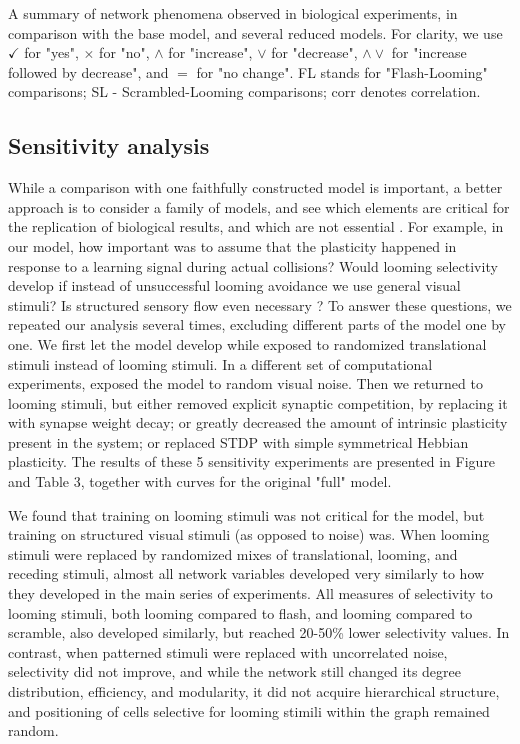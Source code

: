 \documentclass{article}
\begin{document}
\begin{table}
    
    \caption{A summary of network phenomena observed in biological experiments, in comparison with the base model, and several reduced models. For clarity, we use $\checkmark$ for "yes", $\times$ for "no", $\land$ for "increase", $\lor$ for "decrease", $\land \lor$ for "increase followed by decrease", and $=$ for "no change". FL stands for "Flash-Looming" comparisons; SL - Scrambled-Looming comparisons; corr denotes correlation.}
\end{table}
\restoregeometry

\subsection*{Sensitivity analysis}

While a comparison with one faithfully constructed model is important, a better approach is to consider a family of models, and see which elements are critical for the replication of biological results, and which are not essential \citep{linderman2017constrain,pauli2018repro}. For example, in our model, how important was to assume that the plasticity happened in response to a learning signal during actual collisions? Would  looming selectivity develop if instead of unsuccessful looming avoidance we use general visual stimuli? Is structured sensory flow even necessary \citep{triplett2018emergence}? To answer these questions, we repeated our analysis several times, excluding different parts of the model one by one. We first let the model develop while exposed to randomized translational stimuli instead of looming stimuli. In a different set of computational experiments, exposed the model to random visual noise. Then we returned to looming stimuli, but either removed explicit synaptic competition, by replacing it with synapse weight decay; or greatly decreased the amount of intrinsic plasticity present in the system; or replaced STDP with simple symmetrical Hebbian plasticity. The results of these 5 sensitivity experiments are presented in Figure and Table 3, together with curves for the original "full" model.

We found that training on looming stimuli was not critical for the model, but training on structured visual stimuli (as opposed to noise) was. When looming stimuli were replaced by randomized mixes of translational, looming, and receding stimuli, almost all network variables developed very similarly to how they developed in the main series of experiments. All measures of selectivity to looming stimuli, both looming compared to flash, and looming compared to scramble, also developed similarly, but reached 20-50\% lower selectivity values. In contrast, when patterned stimuli were replaced with uncorrelated noise, selectivity did not improve, and while the network still changed its degree distribution, efficiency, and modularity, it did not acquire hierarchical structure, and positioning of cells selective for looming stimili within the graph remained random.
\end{document}
